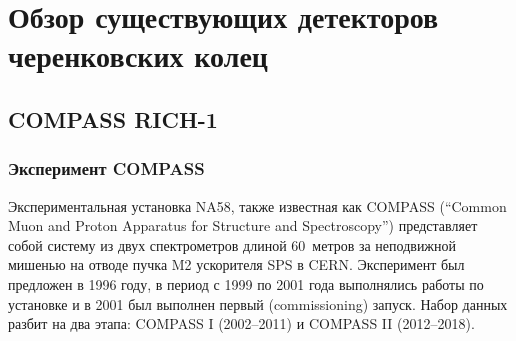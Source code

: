 

\section{Обзор существующих детекторов черенковских колец}\label{sec:secRiches}

\subsection{COMPASS RICH-1}\label{sec:CompassRich1}


\subsubsection{Эксперимент COMPASS}

Экспериментальная установка NA58, также известная как COMPASS (``Common Muon and Proton Apparatus for Structure and Spectroscopy'') представляет собой систему из двух спектрометров длиной 60~метров за неподвижной мишенью на отводе пучка M2 ускорителя SPS в CERN. Эксперимент был предложен в 1996 году, в период с 1999 по 2001 года выполнялись работы по установке и в 2001 был выполнен первый (commissioning) запуск. Набор данных разбит на два этапа: COMPASS I (2002--2011) и COMPASS II (2012--2018). 




